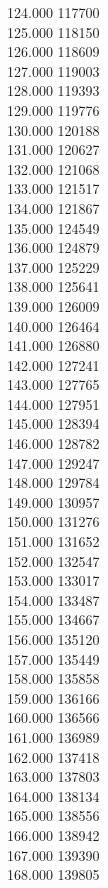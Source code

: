 { 124.000	117700 \\
 125.000	118150 \\
 126.000	118609 \\
 127.000	119003 \\
 128.000	119393 \\
 129.000	119776 \\
 130.000	120188 \\
 131.000	120627 \\
 132.000	121068 \\
 133.000	121517 \\
 134.000	121867 \\
 135.000	124549 \\
 136.000	124879 \\
 137.000	125229 \\
 138.000	125641 \\
 139.000	126009 \\
 140.000	126464 \\
 141.000	126880 \\
 142.000	127241 \\
 143.000	127765 \\
 144.000	127951 \\
 145.000	128394 \\
 146.000	128782 \\
 147.000	129247 \\
 148.000	129784 \\
 149.000	130957 \\
 150.000	131276 \\
 151.000	131652 \\
 152.000	132547 \\
 153.000	133017 \\
 154.000	133487 \\
 155.000	134667 \\
 156.000	135120 \\
 157.000	135449 \\
 158.000	135858 \\
 159.000	136166 \\
 160.000	136566 \\
 161.000	136989 \\
 162.000	137418 \\
 163.000	137803 \\
 164.000	138134 \\
 165.000	138556 \\
 166.000	138942 \\
 167.000	139390 \\
 168.000	139805 \\
}
